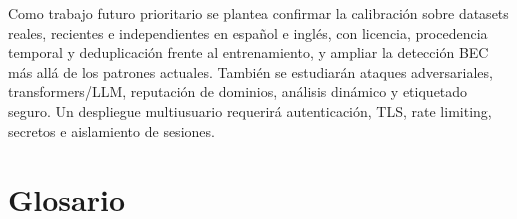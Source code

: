 \documentclass[11pt,a4paper,oneside]{report}
\begin{document}
Como trabajo futuro prioritario se plantea confirmar la calibración sobre datasets reales, recientes e independientes en español e inglés, con licencia, procedencia temporal y deduplicación frente al entrenamiento, y ampliar la detección BEC más allá de los patrones actuales. También se estudiarán ataques adversariales, transformers/LLM, reputación de dominios, análisis dinámico y etiquetado seguro. Un despliegue multiusuario requerirá autenticación, TLS, rate limiting, secretos e aislamiento de sesiones.

\chapter*{Glosario}

\begin{description}[style=nextline,leftmargin=3.3cm]


\end{description}
\end{document}

